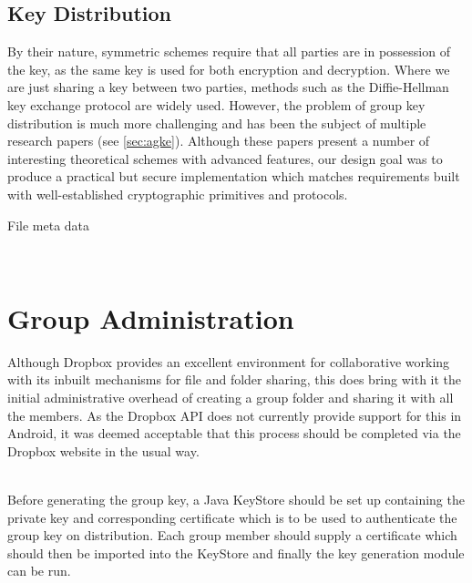 \subsection*{Key Distribution}
By their nature, symmetric  schemes require that all parties are in possession of the key, as the same key is used for both encryption and decryption.  Where we are just sharing a key between two parties, methods such as the Diffie-Hellman key exchange protocol \cite{dh1976}  are widely used.  However, the problem of group key distribution is much more challenging and has been the subject of multiple research papers (see  \ref{sec:agke}).  Although these papers present a number of interesting theoretical schemes with advanced features, our design goal was to produce a practical but secure implementation which matches requirements built with well-established cryptographic primitives and protocols.    


File meta data


\\




\section{Group Administration}

Although Dropbox provides an excellent environment for collaborative working with its inbuilt mechanisms for file and folder sharing, this does bring with it the initial administrative overhead of creating a group folder and sharing it with all the members.  As the Dropbox API does not currently provide support for  this in Android, it was deemed acceptable that this process should be completed via the Dropbox website in the usual way.  

\\

Before generating the group key, a Java KeyStore should be set up containing the private key and corresponding certificate which is to be used to authenticate the group key on distribution.  Each group member should supply a certificate which should then be imported into the KeyStore and finally the key generation module can be run.  

